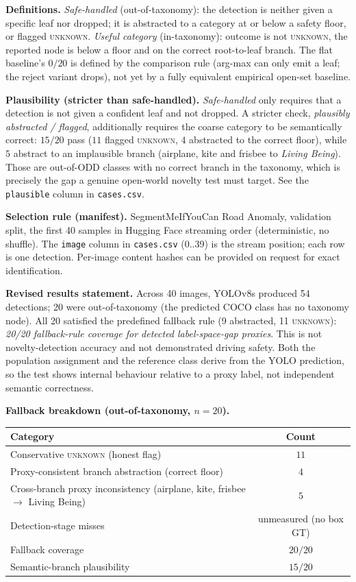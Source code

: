 \documentclass[10pt]{article}
\begin{document}
\textbf{Definitions.} \emph{Safe-handled} (out-of-taxonomy): the detection is
neither given a specific leaf nor dropped; it is abstracted to a category at or
below a safety floor, or flagged \textsc{unknown}. \emph{Useful category}
(in-taxonomy): outcome is not \textsc{unknown}, the reported node is below a
floor and on the correct root-to-leaf branch. The flat baseline's $0/20$ is
defined by the comparison rule (arg-max can only emit a leaf; the reject variant
drops), not yet by a fully equivalent empirical open-set baseline.

\textbf{Plausibility (stricter than safe-handled).} \emph{Safe-handled} only
requires that a detection is not given a confident leaf and not dropped. A
stricter check, \emph{plausibly abstracted / flagged}, additionally requires the
coarse category to be semantically correct: $15/20$ pass ($11$ flagged
\textsc{unknown}, $4$ abstracted to the correct floor), while $5$ abstract to an
implausible branch (airplane, kite and frisbee to \emph{Living Being}). Those are
out-of-ODD classes with no correct branch in the taxonomy, which is precisely the
gap a genuine open-world novelty test must target. See the \texttt{plausible}
column in \texttt{cases.csv}.

\textbf{Selection rule (manifest).} SegmentMeIfYouCan Road Anomaly, validation
split, the first 40 samples in Hugging Face streaming order (deterministic, no
shuffle). The \texttt{image} column in \texttt{cases.csv} (0..39) is the stream
position; each row is one detection. Per-image content hashes can be provided on
request for exact identification.

\textbf{Revised results statement.} Across 40 images, YOLOv8s produced 54
detections; 20 were out-of-taxonomy (the predicted COCO class has no taxonomy
node). All 20 satisfied the predefined fallback rule (9 abstracted, 11
\textsc{unknown}): \emph{20/20 fallback-rule coverage for detected
label-space-gap proxies}. This is not novelty-detection accuracy and not
demonstrated driving safety. Both the population assignment and the reference
class derive from the YOLO prediction, so the test shows internal behaviour
relative to a proxy label, not independent semantic correctness.

\textbf{Fallback breakdown (out-of-taxonomy, $n=20$).}
\begin{center}
\begin{tabular}{@{}lc@{}}
\toprule
Category & Count \\
\midrule
Conservative \textsc{unknown} (honest flag) & $11$ \\
Proxy-consistent branch abstraction (correct floor) & $4$ \\
Cross-branch proxy inconsistency (airplane, kite, frisbee $\to$ Living Being) & $5$ \\
Detection-stage misses & unmeasured (no box GT) \\
\midrule
Fallback coverage & $20/20$ \\
Semantic-branch plausibility & $15/20$ \\
\bottomrule
\end{tabular}
\end{center}
\end{document}
